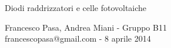\documentclass[11pt, twoside, a4paper]{article}
\begin{document}
\begin{center}

        {\huge Diodi raddrizzatori e celle fotovoltaiche}
    \vspace{0.1cm}

      	{Francesco Pasa, Andrea Miani - Gruppo B11} \\
      	{francescopasa@gmail.com - 8 aprile 2014}
    \vspace{-0.2cm}

\end{center}





\end{document}
